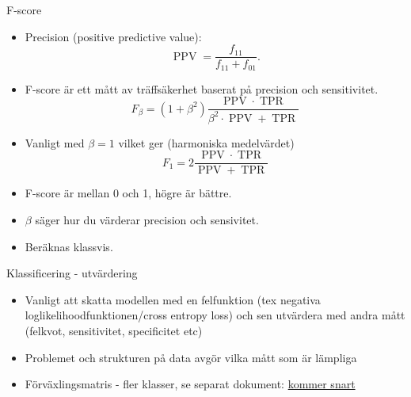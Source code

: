 \documentclass[10pt,english]{beamer}
\begin{document}
\begin{frame}{F-score}
    
    \begin{itemize}
        \item  Precision (positive predictive value):
        \begin{equation*}
            \operatorname{PPV} = \frac{f_{11}}{f_{11} + f_{01}}.
        \end{equation*}
        \item F-score är ett mått av träffsäkerhet baserat på precision och sensitivitet.
        \begin{equation*}
            F_{\beta} = (1 + \beta^2) \frac{\operatorname{PPV} \cdot \operatorname{TPR}}{\beta^2 \cdot \operatorname{PPV} + \operatorname{TPR}}
        \end{equation*}
        \item Vanligt med $\beta=1$ vilket ger (harmoniska medelvärdet)
        \begin{equation*}
            F_1 = 2 \frac{\operatorname{PPV} \cdot \operatorname{TPR}}{\operatorname{PPV} + \operatorname{TPR}}
        \end{equation*}
        \item F-score är mellan 0 och 1, högre är bättre.
        \item $\beta$ säger hur du värderar precision och sensivitet.
        \item Beräknas klassvis.
    \end{itemize}

\end{frame}


\begin{frame}{Klassificering - utvärdering}


\begin{itemize}
    \item Vanligt att skatta modellen med en felfunktion (tex negativa loglikelihoodfunktionen/cross entropy loss) och sen utvärdera med andra mått (felkvot, sensitivitet, specificitet etc)
    \item Problemet och strukturen på data avgör vilka mått som är lämpliga
    \item Förväxlingsmatris - fler klasser, se separat dokument: \href{https://raw.githubusercontent.com/STIMALiU/732G57_DM/master/other/confusion\%20matrix\%20classification\%20evaluation\%20metrics.pdf}{kommer snart}
\end{itemize}
    
\end{frame}
\end{document}

